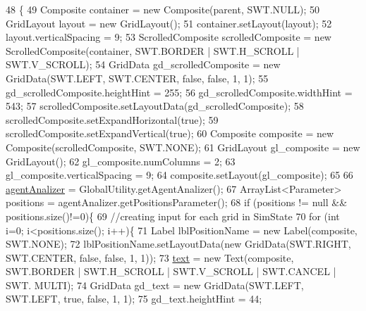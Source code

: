 \begin{DoxyCode}
48                                                 \{
49         Composite container = \textcolor{keyword}{new} Composite(parent, SWT.NULL);
50         GridLayout layout = \textcolor{keyword}{new} GridLayout();
51         container.setLayout(layout);
52         layout.verticalSpacing = 9;     
53         ScrolledComposite scrolledComposite = \textcolor{keyword}{new} ScrolledComposite(container, SWT.BORDER | SWT.H\_SCROLL | 
      SWT.V\_SCROLL);
54         GridData gd\_scrolledComposite = \textcolor{keyword}{new} GridData(SWT.LEFT, SWT.CENTER, \textcolor{keyword}{false}, \textcolor{keyword}{false}, 1, 1);
55         gd\_scrolledComposite.heightHint = 255;
56         gd\_scrolledComposite.widthHint = 543;
57         scrolledComposite.setLayoutData(gd\_scrolledComposite);
58         scrolledComposite.setExpandHorizontal(\textcolor{keyword}{true});
59         scrolledComposite.setExpandVertical(\textcolor{keyword}{true});      
60         Composite composite = \textcolor{keyword}{new} Composite(scrolledComposite, SWT.NONE);
61         GridLayout gl\_composite = \textcolor{keyword}{new} GridLayout();
62         gl\_composite.numColumns = 2;
63         gl\_composite.verticalSpacing = 9;
64         composite.setLayout(gl\_composite);
65         
66         \hyperlink{classit_1_1isislab_1_1masonassisteddocumentation_1_1mason_1_1wizards_1_1_e___agent_position_page_a2fe88598fc7248012ccf5298134f0196}{agentAnalizer} = GlobalUtility.getAgentAnalizer();      
67         ArrayList<Parameter> positions = agentAnalizer.getPositionsParameter(); 
68         \textcolor{keywordflow}{if} (positions != null && positions.size()!=0)\{
69             \textcolor{comment}{//creating input for each grid in SimState}
70             \textcolor{keywordflow}{for} (\textcolor{keywordtype}{int} i=0; i<positions.size(); i++)\{         
71                 Label lblPositionName = \textcolor{keyword}{new} Label(composite, SWT.NONE);
72                 lblPositionName.setLayoutData(\textcolor{keyword}{new} GridData(SWT.RIGHT, SWT.CENTER, \textcolor{keyword}{false}, \textcolor{keyword}{false}, 1, 1));
73                 \hyperlink{classit_1_1isislab_1_1masonassisteddocumentation_1_1mason_1_1wizards_1_1_e___agent_position_page_aa1fe38181afe24af4925ce05d88ae0f6}{text} = \textcolor{keyword}{new} Text(composite, SWT.BORDER | SWT.H\_SCROLL | SWT.V\_SCROLL | SWT.CANCEL | SWT.
      MULTI);
74                 GridData gd\_text = \textcolor{keyword}{new} GridData(SWT.LEFT, SWT.LEFT, \textcolor{keyword}{true}, \textcolor{keyword}{false}, 1, 1);
75                 gd\_text.heightHint = 44;

\end{DoxyCode}

